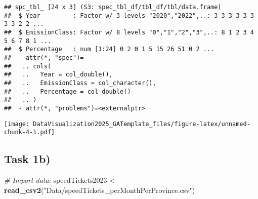 \documentclass[
]{article}
\newenvironment{Shaded}{\begin{snugshade}}{\end{snugshade}}
\newcommand{\AttributeTok}[1]{\textcolor[rgb]{0.13,0.29,0.53}{#1}}
\newcommand{\CommentTok}[1]{\textcolor[rgb]{0.56,0.35,0.01}{\textit{#1}}}
\newcommand{\FunctionTok}[1]{\textcolor[rgb]{0.13,0.29,0.53}{\textbf{#1}}}
\newcommand{\NormalTok}[1]{#1}
\newcommand{\OtherTok}[1]{\textcolor[rgb]{0.56,0.35,0.01}{#1}}
\newcommand{\SpecialCharTok}[1]{\textcolor[rgb]{0.81,0.36,0.00}{\textbf{#1}}}
\newcommand{\StringTok}[1]{\textcolor[rgb]{0.31,0.60,0.02}{#1}}
\begin{document}
\begin{verbatim}
## spc_tbl_ [24 x 3] (S3: spec_tbl_df/tbl_df/tbl/data.frame)
##  $ Year         : Factor w/ 3 levels "2020","2022",..: 3 3 3 3 3 3 3 3 2 2 ...
##  $ EmissionClass: Factor w/ 8 levels "0","1","2","3",..: 8 1 2 3 4 5 6 7 8 1 ...
##  $ Percentage   : num [1:24] 0 2 0 1 5 15 26 51 0 2 ...
##  - attr(*, "spec")=
##   .. cols(
##   ..   Year = col_double(),
##   ..   EmissionClass = col_character(),
##   ..   Percentage = col_double()
##   .. )
##  - attr(*, "problems")=<externalptr>
\end{verbatim}

\begin{Shaded}
\end{Shaded}

\texttt{[image: DataVisualization2025\_GATemplate\_files/figure-latex/unnamed-chunk-4-1.pdf]}

\subsection{Task 1b)}\label{task-1b}

\begin{Shaded}
\begin{Highlighting}[]
\CommentTok{\# Import data:}
\NormalTok{speedTickets2023 }\OtherTok{\textless{}{-}} \FunctionTok{read\_csv2}\NormalTok{(}\StringTok{"Data/speedTickets\_perMonthPerProvince.csv"}\NormalTok{)}
\end{Highlighting}
\end{Shaded}
\end{document}
